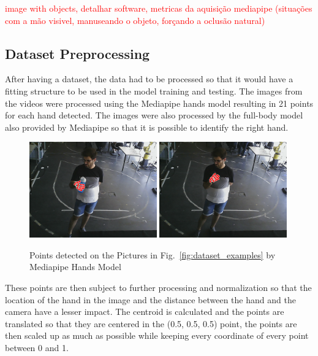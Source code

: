 \textcolor{red}{image with objects, detalhar software, metricas da aquisição mediapipe (situações com a mão visivel, manuseando o objeto, forçando a oclusão natural)}

\subsection{Dataset Preprocessing}

After having a dataset, the data had to be processed so that it would have a fitting structure to be used in the model training and testing. The images from the videos were processed using the Mediapipe hands model resulting in 21 points for each hand detected. The images were also processed by the full-body model also provided by Mediapipe so that it is possible to identify the right hand.

\begin{figure}[H]
    \centerline{\includegraphics[width=0.49\textwidth]{figs/dataset_preprocessing2_1.png} \includegraphics[width=0.49\textwidth]{figs/dataset_preprocessing2_2.png}}
    \caption[Points detected on the Pictures in Fig.~\ref{fig:dataset_examples} by Mediapipe Hands Model]{Points detected on the Pictures in Fig.~\ref{fig:dataset_examples} by Mediapipe Hands Model}
    \label{fig:dataset_examples2}
\end{figure}

These points are then subject to further processing and normalization so that the location of the hand in the image and the distance between the hand and the camera have a lesser impact. The centroid is calculated and the points are translated so that they are centered in the (0.5, 0.5, 0.5) point, the points are then scaled up as much as possible while keeping every coordinate of every point between 0 and 1.

